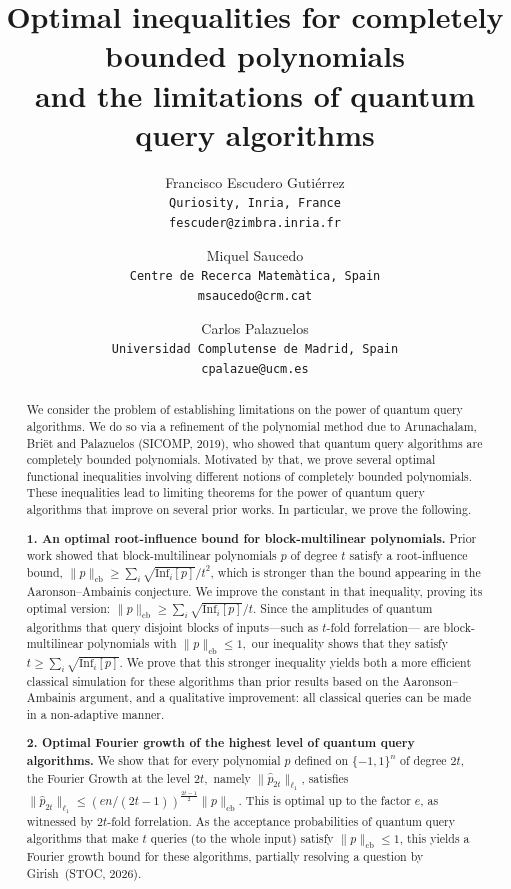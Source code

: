 \documentclass[11pt]{article}
\title{
Optimal inequalities for completely bounded polynomials\\ and the limitations of quantum query algorithms
}
\date{\vspace{-1cm}}
\author{Francisco Escudero Guti\'errez\\ \texttt{Quriosity, Inria, France} \\ \texttt{fescuder@zimbra.inria.fr}
\and
Miquel Saucedo\\ \texttt{Centre de Recerca Matemàtica, Spain} \\ \texttt{msaucedo@crm.cat}
\and
Carlos Palazuelos\\ \texttt{Universidad Complutense de Madrid, Spain} \\ \texttt{cpalazue@ucm.es}}
\DeclareMathOperator{\cb}{cb}
\newcommand{\norm}[1]{\|#1\|}
\newcommand{\1}{\mathbf{1}}
\newcommand\Inf{\mathrm{Inf}}
\theoremstyle{plain}
\theoremstyle{definition}
\theoremstyle{remark}
\begin{document}
\maketitle


\begin{abstract}
    We consider the problem of establishing limitations on the power of quantum query algorithms. 
    We do so via a refinement of the polynomial method due to Arunachalam, Briët and Palazuelos (SICOMP, 2019), who showed that quantum query algorithms are completely bounded polynomials. Motivated by that, we prove several optimal functional inequalities involving different notions of completely bounded polynomials. These inequalities lead to limiting theorems for the power of quantum query algorithms that improve on several prior works. In particular, we prove the following.

    \textbf{1. An optimal root-influence bound  for block-multilinear polynomials.} Prior work showed that block-multilinear polynomials $p$ of degree $t$ satisfy a root-influence bound, $\norm{p}_{\cb}\geq \sum_i \sqrt{\Inf_i[p]}/t^2$, which is stronger than the bound appearing in the Aaronson--Ambainis conjecture. We improve the constant in that inequality, proving its optimal version: $\norm{p}_{\cb}\geq \sum_i \sqrt{\Inf_i[p]}/t$. Since the amplitudes of quantum algorithms that query disjoint blocks of inputs—such as $t$-fold forrelation— are block-multilinear polynomials with  $\norm{p}_{\cb}\leq 1,$ our inequality shows that they satisfy $t\geq \sum_i\sqrt{\Inf_i[p]}$. We prove that this stronger inequality yields both a more efficient classical simulation for these algorithms than prior results based on the Aaronson–Ambainis argument, and a qualitative improvement: all classical queries can be made in a non-adaptive manner.

    \textbf{2. Optimal Fourier growth of the highest level of quantum query algorithms.} We show that for every polynomial $p$ defined on $\{-1,1\}^n$ of degree $2t$, the Fourier Growth at the level $2t,$ namely $\norm{\widehat p_{2t}}_{\ell_1}$, satisfies $\norm{\widehat p_{2t}}_{\ell_1}\leq (en/(2t-1))^{\frac{2t-1}{2}}\norm{p}_{\cb}$. This is optimal up to the factor $e$, as witnessed by $2t$-fold forrelation. As the acceptance probabilities of quantum query algorithms that make $t$ queries (to the whole input) satisfy $\norm{p}_{\cb}\leq 1$, this yields a Fourier growth bound for these algorithms, partially resolving a question by Girish~(STOC, 2026).
    

\end{abstract}
\end{document}

